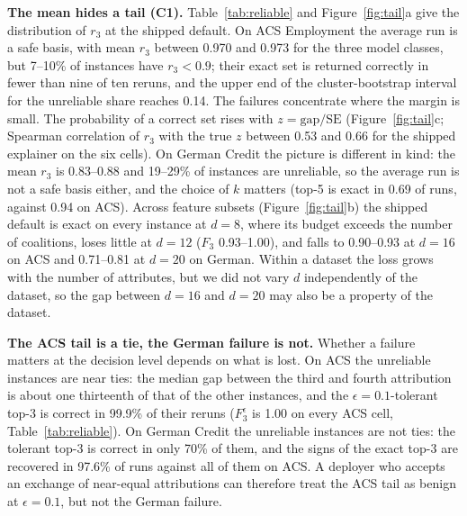 \textbf{The mean hides a tail (C1).}
Table~\ref{tab:reliable} and Figure~\ref{fig:tail}a give the distribution of $r_3$ at the shipped default. On ACS Employment the average run is a safe basis, with mean $r_3$ between 0.970 and 0.973 for the three model classes, but 7--10\% of instances have $r_3<0.9$; their exact set is returned correctly in fewer than nine of ten reruns, and the upper end of the cluster-bootstrap interval for the unreliable share reaches 0.14. The failures concentrate where the margin is small. The probability of a correct set rises with $z=\text{gap}/\mathrm{SE}$ (Figure~\ref{fig:tail}c; Spearman correlation of $r_3$ with the true $z$ between 0.53 and 0.66 for the shipped explainer on the six cells). On German Credit the picture is different in kind: the mean $r_3$ is 0.83--0.88 and 19--29\% of instances are unreliable, so the average run is not a safe basis either, and the choice of $k$ matters (top-5 is exact in 0.69 of runs, against 0.94 on ACS). Across feature subsets (Figure~\ref{fig:tail}b) the shipped default is exact on every instance at $d=8$, where its budget exceeds the number of coalitions, loses little at $d=12$ ($F_3$ 0.93--1.00), and falls to 0.90--0.93 at $d=16$ on ACS and 0.71--0.81 at $d=20$ on German. Within a dataset the loss grows with the number of attributes, but we did not vary $d$ independently of the dataset, so the gap between $d=16$ and $d=20$ may also be a property of the dataset.

\textbf{The ACS tail is a tie, the German failure is not.}
Whether a failure matters at the decision level depends on what is lost. On ACS the unreliable instances are near ties: the median gap between the third and fourth attribution is about one thirteenth of that of the other instances, and the $\epsilon{=}0.1$-tolerant top-3 is correct in 99.9\% of their reruns ($F_3^{\epsilon}$ is 1.00 on every ACS cell, Table~\ref{tab:reliable}). On German Credit the unreliable instances are not ties: the tolerant top-3 is correct in only 70\% of them, and the signs of the exact top-3 are recovered in 97.6\% of runs against all of them on ACS. A deployer who accepts an exchange of near-equal attributions can therefore treat the ACS tail as benign at $\epsilon=0.1$, but not the German failure.

